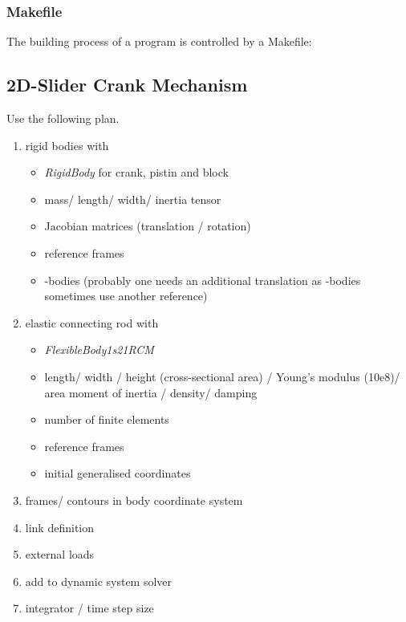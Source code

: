 

\subsubsection{Makefile} \enlargethispage{5mm}
The building process of a program is controlled by a Makefile:


\subsection{2D-Slider Crank Mechanism}
Use the following plan.
\begin{enumerate}
\item rigid bodies with
\begin{itemize}
\item \emph{RigidBody} for crank, pistin and block
\item mass/ length/ width/ inertia tensor
\item Jacobian matrices (translation / rotation)
\item reference frames
\item \OpenMBV{}-bodies (probably one needs an additional translation as \OpenMBV{}-bodies sometimes use another reference)
\end{itemize}

\item elastic connecting rod with
\begin{itemize}
\item \emph{FlexibleBody1s21RCM}
\item length/ width / height (cross-sectional area) / Young's modulus (10e8)/ area moment of inertia / density/ damping
\item number of finite elements
\item reference frames
\item initial generalised coordinates
\end{itemize}

\item frames/ contours in body coordinate system
\item link definition
\item external loads
\item add to dynamic system solver
\item integrator / time step size
\end{enumerate}

